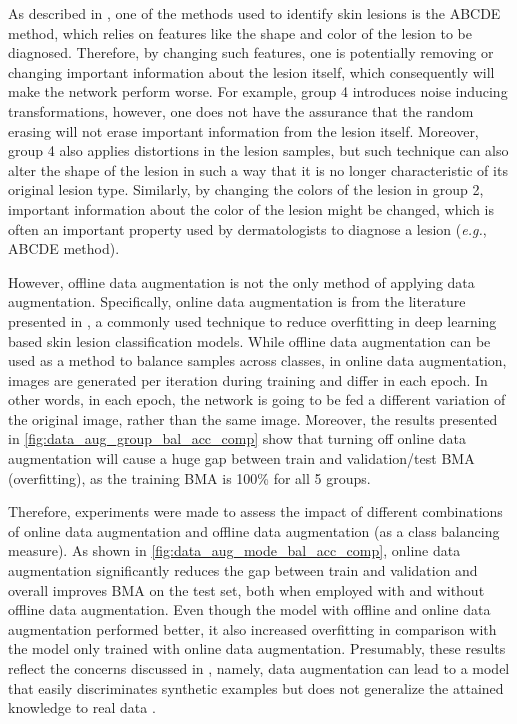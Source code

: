     As described in , one of the methods used to identify skin lesions is the ABCDE method, which relies on features like the shape and color of the lesion to be diagnosed. Therefore, by changing such features, one is potentially removing or changing important information about the lesion itself, which consequently will make the network perform worse. For example, group 4 introduces noise inducing transformations, however, one does not have the assurance that the random erasing will not erase important information from the lesion itself. Moreover, group 4 also applies distortions in the lesion samples, but such technique can also alter the shape of the lesion in such a way that it is no longer characteristic of its original lesion type. Similarly, by changing the colors of the lesion in group 2, important information about the color of the lesion might be changed, which is often an important property used by dermatologists to diagnose a lesion (\textit{e.g.}, ABCDE method).  \par
    
    However, offline data augmentation is not the only method of applying data augmentation. Specifically, online data augmentation is from the literature presented in , a commonly used technique to reduce overfitting in deep learning based skin lesion classification models. While offline data augmentation can be used as a method to balance samples across classes, in online data augmentation, images are generated per iteration during training and differ in each epoch. In other words, in each epoch, the network is going to be fed a different variation of the original image, rather than the same image.  Moreover, the results presented in \autoref{fig:data_aug_group_bal_acc_comp} show that turning off online data augmentation will cause a huge gap between train and validation/test \ac{BMA} (overfitting), as the training \ac{BMA} is 100\% for all 5 groups. 
    
    Therefore, experiments were made to assess the impact of different combinations of online data augmentation and offline data augmentation (as a class balancing measure). As shown in \autoref{fig:data_aug_mode_bal_acc_comp}, online data augmentation significantly reduces the gap between train and validation and overall improves \ac{BMA} on the test set, both when employed with and without offline data augmentation. Even though the model with offline and online data augmentation performed better, it also increased overfitting in comparison with the model only trained with online data augmentation. Presumably, these results reflect the concerns discussed in , namely, data augmentation can lead to a model that easily discriminates synthetic examples but does not generalize the attained knowledge to real data \cite{Ching2018}.  \par
    
